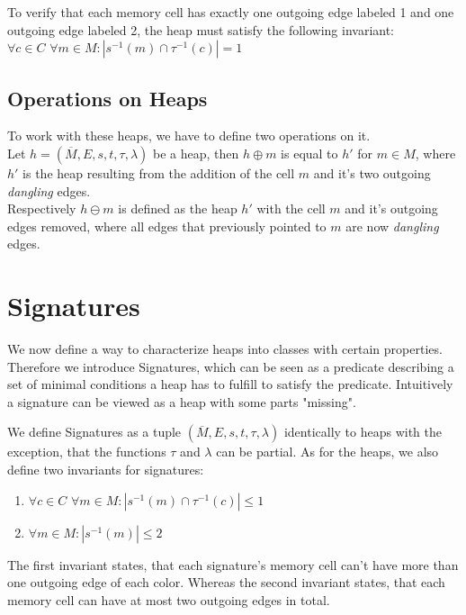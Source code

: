 \noindent
To verify that each memory cell has exactly one outgoing edge labeled 1 and one outgoing edge labeled 2, the heap must satisfy
the following invariant:\\

$\forall c \in C$ $\forall m \in M : |s^{-1}(m) \cap \tau^{-1}(c)| = 1$ \\

\noindent
\subsection{Operations on Heaps}
To work with these heaps, we have to define two operations on it. \\
Let $h = (\overline{M}, E, s, t, \tau, \lambda)$ be a heap, 
then $h \oplus m$ is equal to $h'$ for $m \in M$, where $h'$ is the heap resulting from the addition of the cell $m$ and it's two
outgoing \textit{dangling} edges.\\
Respectively $h \ominus m$ is defined as the heap $h'$ with the cell $m$ and it's outgoing edges removed, where
all edges that previously pointed to $m$ are now \textit{dangling} edges.

\newpage
\section{Signatures}
We now define a way to characterize heaps into classes with certain properties.
Therefore we introduce Signatures, which can be seen as a predicate describing a set of minimal
conditions a heap has to fulfill to satisfy the predicate. 
Intuitively a signature can be viewed as a heap with some parts "missing". 

\noindent
We define Signatures as a tuple $(\overline{M}, E, s, t, \tau, \lambda)$ identically to heaps with the exception,
that the functions $\tau$ and $\lambda$ can be partial. As for the heaps, we also define two invariants for
signatures:

\begin{enumerate}
	\item $\forall c \in C$ $\forall m \in M : |s^{-1}(m) \cap \tau^{-1}(c)| \le 1$
	\item $\forall m \in M : |s^{-1}(m)| \le 2$
\end{enumerate}

\noindent
The first invariant states, that each signature's memory cell can't have more than one outgoing edge of each color.
Whereas the second invariant states, that each memory cell can have at most two outgoing edges in total.

